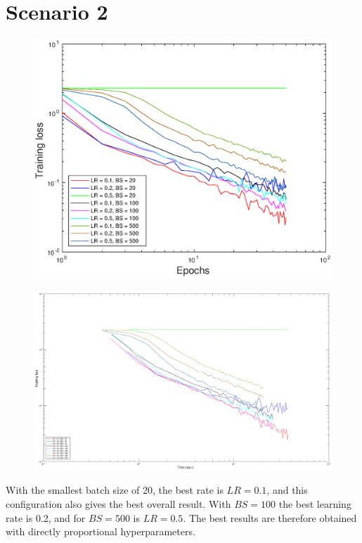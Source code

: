 \documentclass{article}
\begin{document}
\section*{Scenario 2}
	\begin{figure}[!htb]
        \centering
        \includegraphics[width=\textwidth]{figures/sc2_tr_loss}
    \end{figure}
    \begin{figure}[!htb]
        \centering
        \includegraphics[width=\textwidth]{figures/sc2_tr_loss_time}
    \end{figure}

    With the smallest batch size of 20, the best rate is $LR = 0.1$, and this configuration also gives the best overall result. With $BS = 100$ the best learning rate is 0.2, and for $BS = 500$ is $LR = 0.5$.
    The best results are therefore obtained with directly proportional hyperparameters.
    
\end{document}
